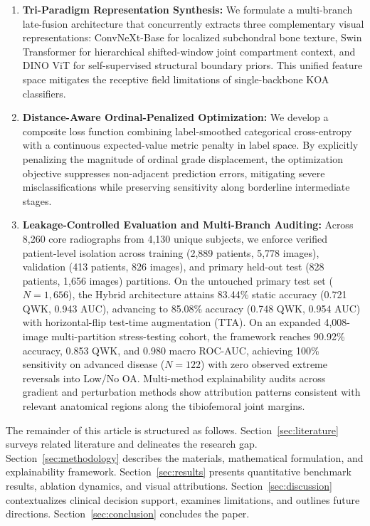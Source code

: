 \documentclass[10pt,journal]{IEEEtran}
\begin{document}
\begin{enumerate}[leftmargin=*, label=\arabic*.]
\item \textbf{Tri-Paradigm Representation Synthesis:} We formulate a multi-branch late-fusion architecture that concurrently extracts three complementary visual representations: ConvNeXt-Base for localized subchondral bone texture, Swin Transformer for hierarchical shifted-window joint compartment context, and DINO ViT for self-supervised structural boundary priors. This unified feature space mitigates the receptive field limitations of single-backbone KOA classifiers.

\item \textbf{Distance-Aware Ordinal-Penalized Optimization:} We develop a composite loss function combining label-smoothed categorical cross-entropy with a continuous expected-value metric penalty in label space. By explicitly penalizing the magnitude of ordinal grade displacement, the optimization objective suppresses non-adjacent prediction errors, mitigating severe misclassifications while preserving sensitivity along borderline intermediate stages.

\item \textbf{Leakage-Controlled Evaluation and Multi-Branch Auditing:} Across 8,260 core radiographs from 4,130 unique subjects, we enforce verified patient-level isolation across training (2,889 patients, 5,778 images), validation (413 patients, 826 images), and primary held-out test (828 patients, 1,656 images) partitions. On the untouched primary test set ($N = 1{,}656$), the Hybrid architecture attains 83.44\% static accuracy (0.721 QWK, 0.943 AUC), advancing to 85.08\% accuracy (0.748 QWK, 0.954 AUC) with horizontal-flip test-time augmentation (TTA). On an expanded 4,008-image multi-partition stress-testing cohort, the framework reaches 90.92\% accuracy, 0.853 QWK, and 0.980 macro ROC-AUC, achieving 100\% sensitivity on advanced disease ($N = 122$) with zero observed extreme reversals into Low/No OA. Multi-method explainability audits across gradient and perturbation methods show attribution patterns consistent with relevant anatomical regions along the tibiofemoral joint margins.
\end{enumerate}

The remainder of this article is structured as follows. Section~\ref{sec:literature} surveys related literature and delineates the research gap. Section~\ref{sec:methodology} describes the materials, mathematical formulation, and explainability framework. Section~\ref{sec:results} presents quantitative benchmark results, ablation dynamics, and visual attributions. Section~\ref{sec:discussion} contextualizes clinical decision support, examines limitations, and outlines future directions. Section~\ref{sec:conclusion} concludes the paper.
\end{document}
